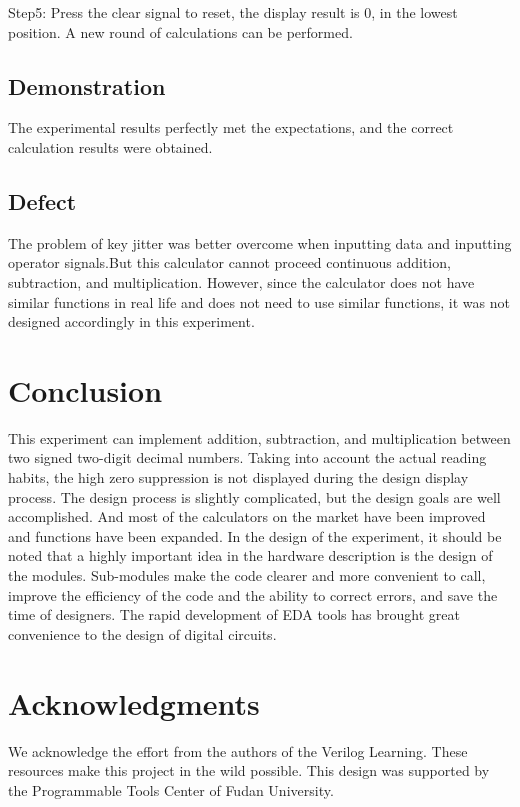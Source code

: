 \documentclass[11pt,journal,compsoc]{IEEEtran}
\begin{document}
Step5: Press the clear signal to reset, the display result is 0, in the lowest position. A new round of calculations can be performed.
\subsection{Demonstration}
The experimental results perfectly met the expectations, and the correct calculation results were obtained. 
\subsection{Defect}
The problem of key jitter was better overcome when inputting data and inputting operator signals.But this calculator cannot proceed continuous addition, subtraction, and multiplication. However, since the calculator does not have similar functions in real life and does not need to use similar functions, it was not designed accordingly in this experiment.

\section{Conclusion}
This experiment can implement addition, subtraction, and multiplication between two signed two-digit decimal numbers. Taking into account the actual reading habits, the high zero suppression is not displayed during the design display process. The design process is slightly complicated, but the design goals are well accomplished. And most of the calculators on the market have been improved and functions have been expanded. In the design of the experiment, it should be noted that a highly important idea in the hardware description is the design of the modules. Sub-modules make the code clearer and more convenient to call, improve the efficiency of the code and the ability to correct errors, and save the time of designers. The rapid development of EDA tools has brought great convenience to the design of digital circuits.
\ifCLASSOPTIONcompsoc
\section*{Acknowledgments}
We acknowledge the effort from the authors of the Verilog Learning. These resources make this project in the wild possible. This design was supported by the Programmable Tools Center of Fudan University.
\end{document}
